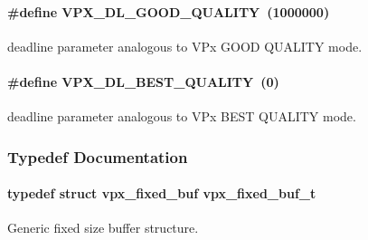 \paragraph[{\texorpdfstring{V\+P\+X\+\_\+\+D\+L\+\_\+\+G\+O\+O\+D\+\_\+\+Q\+U\+A\+L\+I\+TY}{VPX_DL_GOOD_QUALITY}}]{\setlength{\rightskip}{0pt plus 5cm}\#define V\+P\+X\+\_\+\+D\+L\+\_\+\+G\+O\+O\+D\+\_\+\+Q\+U\+A\+L\+I\+TY~(1000000)}\hypertarget{group__encoder_ga5d00a9f9e10b9f49ca91e72c1f01c9fd}{}\label{group__encoder_ga5d00a9f9e10b9f49ca91e72c1f01c9fd}
deadline parameter analogous to V\+Px G\+O\+OD Q\+U\+A\+L\+I\+TY mode. 
\paragraph[{\texorpdfstring{V\+P\+X\+\_\+\+D\+L\+\_\+\+B\+E\+S\+T\+\_\+\+Q\+U\+A\+L\+I\+TY}{VPX_DL_BEST_QUALITY}}]{\setlength{\rightskip}{0pt plus 5cm}\#define V\+P\+X\+\_\+\+D\+L\+\_\+\+B\+E\+S\+T\+\_\+\+Q\+U\+A\+L\+I\+TY~(0)}\hypertarget{group__encoder_gab350573bea112f2fdf8e5677db3ac0da}{}\label{group__encoder_gab350573bea112f2fdf8e5677db3ac0da}
deadline parameter analogous to V\+Px B\+E\+ST Q\+U\+A\+L\+I\+TY mode. 

\subsubsection{Typedef Documentation}
\paragraph[{\texorpdfstring{vpx\+\_\+fixed\+\_\+buf\+\_\+t}{vpx_fixed_buf_t}}]{\setlength{\rightskip}{0pt plus 5cm}typedef struct {\bf vpx\+\_\+fixed\+\_\+buf}  {\bf vpx\+\_\+fixed\+\_\+buf\+\_\+t}}\hypertarget{group__encoder_ga21fab7dd28065f349c97165501223764}{}\label{group__encoder_ga21fab7dd28065f349c97165501223764}


Generic fixed size buffer structure. 

